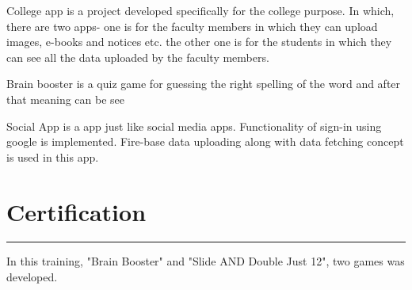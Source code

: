 \documentclass[]{sapna-resume}
\begin{document}
\begin{minipage}[t]{0.66\textwidth}
 
\noindent
\hspace{5em}%
\begin{minipage}{0.85\textwidth\vspace{2pt}}
College app is a project developed specifically for the college purpose. In which, there are two apps- one is for the faculty members in which they can upload images, e-books and notices etc. the other one is for the students in which they can see all the data uploaded by the faculty members.
\end{minipage}
\sectionsep

 
\noindent
\hspace{5em}%
\begin{minipage}{0.85\textwidth\vspace{2pt}}
Brain booster is a quiz game for guessing the right spelling of the word and after that meaning can be see
\end{minipage}
\sectionsep

 
\noindent
\hspace{5em}%
\begin{minipage}{0.85\textwidth\vspace{2pt}}
Social App is a app just like social media apps. Functionality of sign-in using google is implemented. Fire-base data uploading along with data fetching concept is used in this app.
\end{minipage}
\sectionsep

\section{Certification} 
\noindent\rule{12.5cm}{0.4pt}
 
\noindent
\hspace{5em}%
\begin{minipage}{0.85\textwidth\vspace{2pt}}
In this training, "Brain Booster" and "Slide AND Double Just 12", two games was developed.
\end{minipage}
\sectionsep


\end{minipage}
\end{document}
